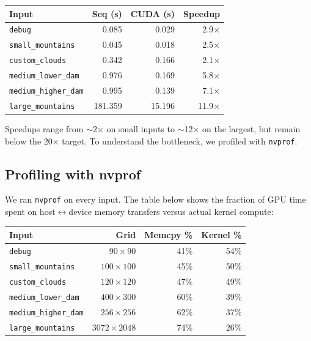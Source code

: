 \documentclass[sigconf, nonacm, review]{acmart}
\begin{document}
\begin{center}
\begin{tabular}{lrrr}
\hline
\textbf{Input} & \textbf{Seq (s)} & \textbf{CUDA (s)} & \textbf{Speedup} \\
\hline
\texttt{debug}             &   0.085 &   0.029 &  2.9$\times$ \\
\texttt{small\_mountains}  &   0.045 &   0.018 &  2.5$\times$ \\
\texttt{custom\_clouds}    &   0.342 &   0.166 &  2.1$\times$ \\
\texttt{medium\_lower\_dam}&   0.976 &   0.169 &  5.8$\times$ \\
\texttt{medium\_higher\_dam}&  0.995 &   0.139 &  7.1$\times$ \\
\texttt{large\_mountains}  & 181.359 &  15.196 & 11.9$\times$ \\
\hline
\end{tabular}
\end{center}

Speedups range from $\sim$2$\times$ on small inputs to $\sim$12$\times$ on the largest, but remain below the 20$\times$ target. To understand the bottleneck, we profiled with \texttt{nvprof}.

\subsection{Profiling with nvprof}
We ran \texttt{nvprof} on every input. The table below shows the fraction of GPU time spent on host$\leftrightarrow$device memory transfers versus actual kernel compute:

\begin{center}
\begin{tabular}{lrrr}
\hline
\textbf{Input} & \textbf{Grid} & \textbf{Memcpy \%} & \textbf{Kernel \%} \\
\hline
\texttt{debug}              & $90\times90$     & 41\% & 54\% \\
\texttt{small\_mountains}   & $100\times100$   & 45\% & 50\% \\
\texttt{custom\_clouds}     & $120\times120$   & 47\% & 49\% \\
\texttt{medium\_lower\_dam} & $400\times300$   & 60\% & 39\% \\
\texttt{medium\_higher\_dam}& $256\times256$   & 62\% & 37\% \\
\texttt{large\_mountains}   & $3072\times2048$ & 74\% & 26\% \\
\hline
\end{tabular}
\end{center}
\end{document}
